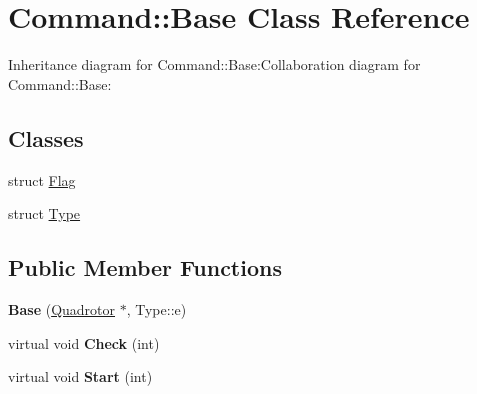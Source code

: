\hypertarget{classCommand_1_1Base}{
\section{Command::Base Class Reference}
\label{classCommand_1_1Base}
}
Inheritance diagram for Command::Base:Collaboration diagram for Command::Base:\subsection*{Classes}
\begin{DoxyCompactItemize}
\item 
struct \hyperlink{structCommand_1_1Base_1_1Flag}{Flag}
\item 
struct \hyperlink{structCommand_1_1Base_1_1Type}{Type}
\end{DoxyCompactItemize}
\subsection*{Public Member Functions}
\begin{DoxyCompactItemize}
\item 
\hypertarget{classCommand_1_1Base_acfdd5eee18d39adfcbe321970d4f27fc}{
{\bfseries Base} (\hyperlink{classQuadrotor}{Quadrotor} $\ast$, Type::e)}
\label{classCommand_1_1Base_acfdd5eee18d39adfcbe321970d4f27fc}

\item 
\hypertarget{classCommand_1_1Base_a1a77b2acc5e0a41d1eee5ab61c2dfafd}{
virtual void {\bfseries Check} (int)}
\label{classCommand_1_1Base_a1a77b2acc5e0a41d1eee5ab61c2dfafd}

\item 
\hypertarget{classCommand_1_1Base_ab85e28c51f1601c05532d68b9a71f425}{
virtual void {\bfseries Start} (int)}
\label{classCommand_1_1Base_ab85e28c51f1601c05532d68b9a71f425}

\end{DoxyCompactItemize}
